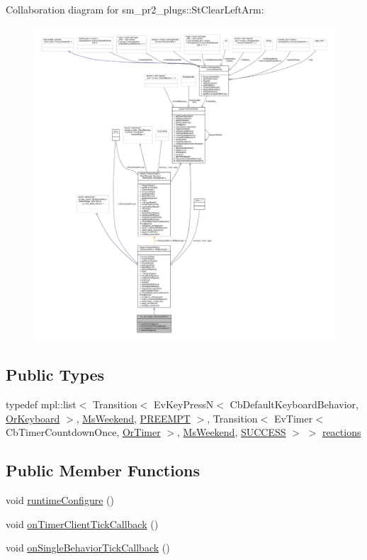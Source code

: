 Collaboration diagram for sm\+\_\+pr2\+\_\+plugs\+:\+:St\+Clear\+Left\+Arm\+:
\nopagebreak
\begin{figure}[H]
\begin{center}
\leavevmode
\includegraphics[width=350pt]{structsm__pr2__plugs_1_1StClearLeftArm__coll__graph}
\end{center}
\end{figure}
\subsection*{Public Types}
\begin{DoxyCompactItemize}
\item 
typedef mpl\+::list$<$ Transition$<$ Ev\+Key\+PressN$<$ Cb\+Default\+Keyboard\+Behavior, \hyperlink{classsm__pr2__plugs_1_1OrKeyboard}{Or\+Keyboard} $>$, \hyperlink{classsm__pr2__plugs_1_1MsWeekend}{Ms\+Weekend}, \hyperlink{classPREEMPT}{P\+R\+E\+E\+M\+PT} $>$, Transition$<$ Ev\+Timer$<$ Cb\+Timer\+Countdown\+Once, \hyperlink{classsm__pr2__plugs_1_1OrTimer}{Or\+Timer} $>$, \hyperlink{classsm__pr2__plugs_1_1MsWeekend}{Ms\+Weekend}, \hyperlink{classSUCCESS}{S\+U\+C\+C\+E\+SS} $>$ $>$ \hyperlink{structsm__pr2__plugs_1_1StClearLeftArm_a62cd92c51a75ac942bdc5eb9917fa002}{reactions}
\end{DoxyCompactItemize}
\subsection*{Public Member Functions}
\begin{DoxyCompactItemize}
\item 
void \hyperlink{structsm__pr2__plugs_1_1StClearLeftArm_a23696f6137f6e29e5144bafea171faaa}{runtime\+Configure} ()
\item 
void \hyperlink{structsm__pr2__plugs_1_1StClearLeftArm_acd6c1a301f1b9c7229d42df9fb871a58}{on\+Timer\+Client\+Tick\+Callback} ()
\item 
void \hyperlink{structsm__pr2__plugs_1_1StClearLeftArm_a948758fe2f92ba1711b142ddd78f03ab}{on\+Single\+Behavior\+Tick\+Callback} ()
\end{DoxyCompactItemize}
